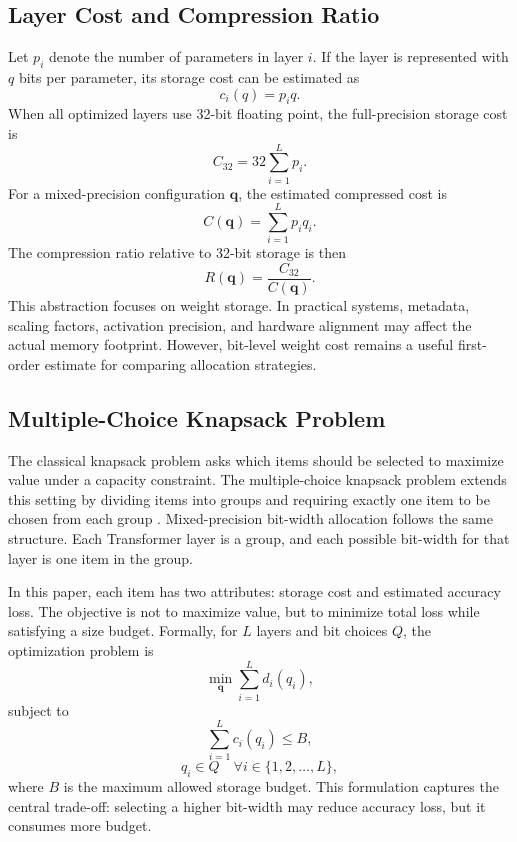 \documentclass[conference]{IEEEtran}
\begin{document}
\subsection{Layer Cost and Compression Ratio}
Let $p_i$ denote the number of parameters in layer $i$. If the layer is represented with $q$ bits per parameter, its storage cost can be estimated as
\begin{equation}
c_i(q)=p_iq.
\end{equation}
When all optimized layers use 32-bit floating point, the full-precision storage cost is
\begin{equation}
C_{32}=32\sum_{i=1}^{L}p_i.
\end{equation}
For a mixed-precision configuration $\mathbf{q}$, the estimated compressed cost is
\begin{equation}
C(\mathbf{q})=\sum_{i=1}^{L}p_iq_i.
\end{equation}
The compression ratio relative to 32-bit storage is then
\begin{equation}
R(\mathbf{q})=\frac{C_{32}}{C(\mathbf{q})}.
\end{equation}
This abstraction focuses on weight storage. In practical systems, metadata, scaling factors, activation precision, and hardware alignment may affect the actual memory footprint. However, bit-level weight cost remains a useful first-order estimate for comparing allocation strategies.

\subsection{Multiple-Choice Knapsack Problem}
The classical knapsack problem asks which items should be selected to maximize value under a capacity constraint. The multiple-choice knapsack problem extends this setting by dividing items into groups and requiring exactly one item to be chosen from each group \cite{martello}. Mixed-precision bit-width allocation follows the same structure. Each Transformer layer is a group, and each possible bit-width for that layer is one item in the group.

In this paper, each item has two attributes: storage cost and estimated accuracy loss. The objective is not to maximize value, but to minimize total loss while satisfying a size budget. Formally, for $L$ layers and bit choices $Q$, the optimization problem is
\begin{equation}
\min_{\mathbf{q}} \sum_{i=1}^{L} d_i(q_i),
\end{equation}
subject to
\begin{equation}
\sum_{i=1}^{L} c_i(q_i) \leq B,
\end{equation}
\begin{equation}
q_i \in Q \quad \forall i \in \{1,2,\ldots,L\},
\end{equation}
where $B$ is the maximum allowed storage budget. This formulation captures the central trade-off: selecting a higher bit-width may reduce accuracy loss, but it consumes more budget.
\end{document}

